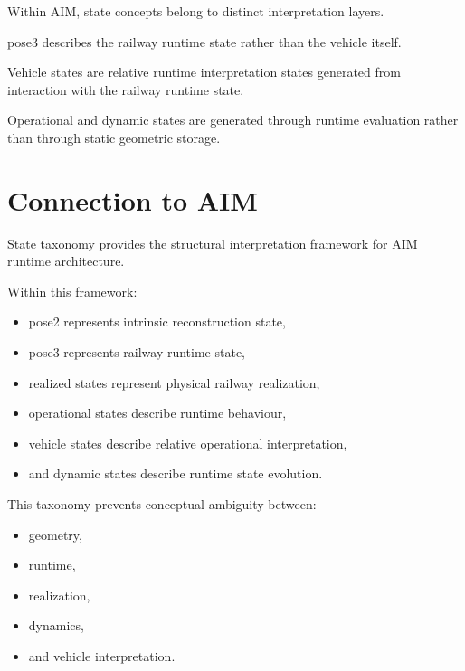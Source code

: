 \begin{proposition}
Within AIM, state concepts belong to distinct interpretation layers.
\end{proposition}

\begin{proposition}
pose3 describes the railway runtime state rather than the vehicle
itself.
\end{proposition}

\begin{proposition}
Vehicle states are relative runtime interpretation states generated from
interaction with the railway runtime state.
\end{proposition}

\begin{proposition}
Operational and dynamic states are generated through runtime evaluation
rather than through static geometric storage.
\end{proposition}

\section{Connection to AIM}

\begin{summary}
State taxonomy provides the structural interpretation framework for AIM
runtime architecture.

Within this framework:
\begin{itemize}
\item pose2 represents intrinsic reconstruction state,
\item pose3 represents railway runtime state,
\item realized states represent physical railway realization,
\item operational states describe runtime behaviour,
\item vehicle states describe relative operational interpretation,
\item and dynamic states describe runtime state evolution.
\end{itemize}

This taxonomy prevents conceptual ambiguity between:
\begin{itemize}
\item geometry,
\item runtime,
\item realization,
\item dynamics,
\item and vehicle interpretation.
\end{itemize}
\end{summary}
